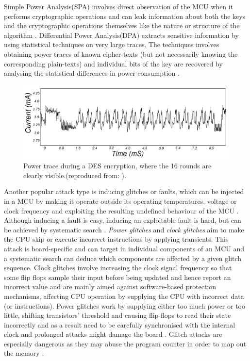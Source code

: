 Simple Power Analysis(SPA) involves direct observation of the MCU when it performs cryptographic operations and can leak information about both the keys and the cryptographic operations themselves like the nature or structure of the algorithm \citep{kocher:DPA} \citep{anderson:tamper_resistance}. Differential Power Analysis(DPA) extracts sensitive information by using statistical techniques on very large traces. The techniques involves obtaining power traces of known cipher-texts (but not necessarily knowing the corresponding plain-texts) and individual bits of the key are recovered by analysing the statistical differences in power consumption \citep{kocher:DPA} \citep{anderson:tamper_resistance}.

	\begin{figure}
		\center
		\includegraphics[scale=0.6]{img/power_des.png}
		\caption{\footnotesize Power trace during a DES encryption, where the 16 rounds are clearly visible.(reproduced from: \protect\citep{kocher:DPA}).}
		\label{fig:des_power}		
	\end{figure}

	
	Another popular attack type is inducing glitches or faults, which can be injected in a MCU by making it operate outside its operating temperatures, voltage or clock frequency and exploiting the resulting undefined behaviour of the MCU \citep{sergei:thesis} \citep{avr_mega}. Although inducing a fault is easy, inducing an exploitable fault is hard, but can be achieved by systematic search \citep{sergei:thesis} \citep{glitches_paper} \citep{website:riscure}. \emph{Power glitches} and \emph{clock glitches} aim to make the CPU skip or execute incorrect instructions by applying transients. This attack is board-specific and can target in individual components of an MCU and a systematic search can deduce which components are affected by a given glitch sequence. Clock glitches involve increasing the clock signal frequency so that some flip flops sample their input before being updated and hence report an incorrect value \citep{sergei:thesis} and are mainly aimed against software-based protection mechanisms, affecting CPU operation by supplying the CPU with incorrect data (or instructions). Power glitches work by supplying either too much power or too little, shifting transistors' threshold and causing flip-flops to read their state incorrectly and as a result need to be carefully synchronised with the internal clock and prolonged attacks might damage the board \citep{sergei:thesis}. Glitch attacks are especially dangerous as they may abuse the program counter in order to map out the memory \citep{glitches_paper} \citep{anderson:cautionary_note} \citep{sergei:thesis}.

